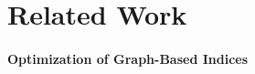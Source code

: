 \documentclass[sigconf,nonacm]{acmart}
\theoremstyle{plain}
\theoremstyle{definition}
\theoremstyle{remark}
\begin{document}


\section{Related Work}
\label{sec:related_work}


\paragraph{Optimization of Graph-Based Indices}
\end{document}
